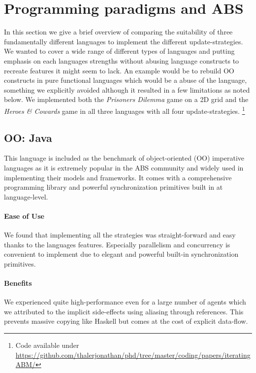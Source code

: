 \section{Programming paradigms and ABS}
In this section we give a brief overview of comparing the suitability of three fundamentally different languages to implement the different update-strategies. We wanted to cover a wide range of different types of languages and putting emphasis on each languages strengths without abusing language constructs to recreate features it might seem to lack. An example would be to rebuild OO constructs in pure functional languages which would be a abuse of the language, something we explicitly avoided although it resulted in a few limitations as noted below. We implemented both the \textit{Prisoners Dilemma} game on a 2D grid and the \textit{Heroes \& Cowards} game in all three languages with all four update-strategies. \footnote{Code available under\\ \url{https://github.com/thalerjonathan/phd/tree/master/coding/papers/iteratingABM/}}

\subsection{OO: Java}
This language is included as the benchmark of object-oriented (OO) imperative languages as it is extremely popular in the ABS community and widely used in implementing their models and frameworks. It comes with a comprehensive programming library and powerful synchronization primitives built in at language-level.

\paragraph{Ease of Use}
We found that implementing all the strategies was straight-forward and easy thanks to the languages features. Especially parallelism and concurrency is convenient to implement due to elegant and powerful built-in synchronization primitives.

\paragraph{Benefits}
We experienced quite high-performance even for a large number of agents which we attributed to the implicit side-effects using aliasing through references. This prevents massive copying like Haskell but comes at the cost of explicit data-flow.

